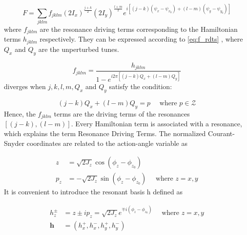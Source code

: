\begin{equation}
    F = \sum_{j k l m} f_{j k l m} \left(2 I_{x}\right)^{\frac{j+k}{2}}\left(2 I_{y}\right)^{\frac{l+m}{2}} e^{i\left[(j-k)\left(\psi_{x}-\psi_{x_{0}}\right)+(l-m)\left(\psi_{y}-\psi_{y_{0}}\right)\right]}
    \label{eq:F_generating}
\end{equation}
where \(f_{jklm}\) are the resonance driving terms corresponding to the Hamiltonian terms \(h_{jklm}\) respectively.
They can be expressed according to \cref{eq:f_rdts} \cite{Tomas_thesis, Franchi_thesis}, where \(Q_x\) and \(Q_y\) are the unperturbed tunes.

\begin{equation}
    f_{jklm} = \frac{h_{jklm}}{1 - e^{i 2 \pi \left[(j-k) Q_{x} + (l-m) Q_{y} \right]}}
    \label{eq:f_rdts}
\end{equation}
 diverges when \(j, k, l, m, Q_x\) and \(Q_y\) satisfy the condition:

\begin{equation}
    (j-k) Q_{x} + (l-m) Q_{y} = p \quad \text{ where } p \in \mathcal{Z}
    \label{eq:resonance_condition}
\end{equation}
Hence, the \(f_{jklm}\) terms are the driving terms of the resonances \([(j-k),(l-m)]\).
Every Hamiltonian term is associated with a resonance, which explains the term Resonance Driving Terms.
The normalized Courant-Snyder coordinates are related to the action-angle variable as

\begin{equation}
    \begin{aligned}
    z &= \sqrt{2 J_{z}} \cos (\phi_{z} - \phi_{z_{0}}) \\
    p_{z} &= -\sqrt{2 J_{z}} \sin (\phi_{z} - \phi_{z_{0}}) \quad \text { where } z=x, y
    \end{aligned}
    \label{eq:courant_snyder_to_action_angle}
\end{equation}
It is convenient to introduce the resonant basis h defined as

\begin{equation}
    \begin{aligned}
    h_{z}^{\pm} &= z \pm i p_{z} = \sqrt{2 J_{z}} e^{\mp i \left(\phi_{z}-\phi_{z_{0}}\right)} \quad \text { where } z=x, y \\
    \mathbf{h} &= \left( h_{x}^{+}, h_{x}^{-}, h_{y}^{+}, h_{y}^{-} \right)
    \end{aligned}
    \label{eq:resonant_basis_h}
\end{equation}

